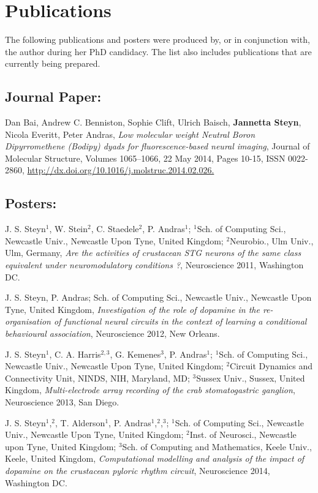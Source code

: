 \chapter{Publications}
\label{chap:Publications}

The following publications and posters were produced by, or in conjunction with, the author during her PhD candidacy. The list also includes publications that are currently being prepared.

\section{Journal Paper:}
Dan Bai, Andrew C. Benniston, Sophie Clift, Ulrich Baisch, \textbf{Jannetta Steyn}, Nicola Everitt, Peter Andras, \textit{Low molecular weight Neutral Boron Dipyrromethene (Bodipy) dyads for fluorescence-based neural imaging}, Journal of Molecular Structure, Volumes 1065–1066, 22 May 2014, Pages 10-15, ISSN 0022-2860,
\url{http://dx.doi.org/10.1016/j.molstruc.2014.02.026.}

\section{Posters:}
J. S. Steyn$^{1}$, W. Stein$^{2}$, C. Staedele$^{2}$, P. Andras$^{1}$; $^{1}$Sch. of Computing Sci., Newcastle Univ., Newcastle Upon Tyne, United Kingdom; $^{2}$Neurobio., Ulm Univ., Ulm, Germany, \textit{Are the activities of crustacean STG neurons of the same class equivalent under neuromodulatory conditions ?}, Neuroscience 2011, Washington DC.

J. S. Steyn, P. Andras; Sch. of Computing Sci., Newcastle Univ., Newcastle Upon Tyne, United Kingdom, \textit{Investigation of the role of dopamine in the re-organisation of functional neural circuits in the context of learning a conditional behavioural association}, Neuroscience 2012, New Orleans.

J. S. Steyn$^{1}$, C. A. Harris$^{2,3}$, G. Kemenes$^{3}$, P. Andras$^{1}$; 
$^{1}$Sch. of Computing Sci., Newcastle Univ., Newcastle Upon Tyne, United Kingdom; $^{2}$Circuit Dynamics and Connectivity Unit, NINDS, NIH, Maryland, MD; $^{3}$Sussex Univ., Sussex, United Kingdom, \textit{Multi-electrode array recording of the crab stomatogastric ganglion}, Neuroscience 2013, San Diego.

J. S. Steyn$^{1}$,$^{2}$, T. Alderson$^{1}$, P. Andras$^{1}$,$^{2}$,$^{3}$; $^{1}$Sch. of Computing Sci., Newcastle Univ., Newcastle Upon Tyne, United Kingdom; $^{2}$Inst. of Neurosci., Newcastle upon Tyne, United Kingdom; $^{3}$Sch. of Computing and Mathematics, Keele Univ., Keele, United Kingdom, \textit{Computational modelling and analysis of the impact of dopamine on the crustacean pyloric rhythm circuit}, Neuroscience 2014, Washington DC.

